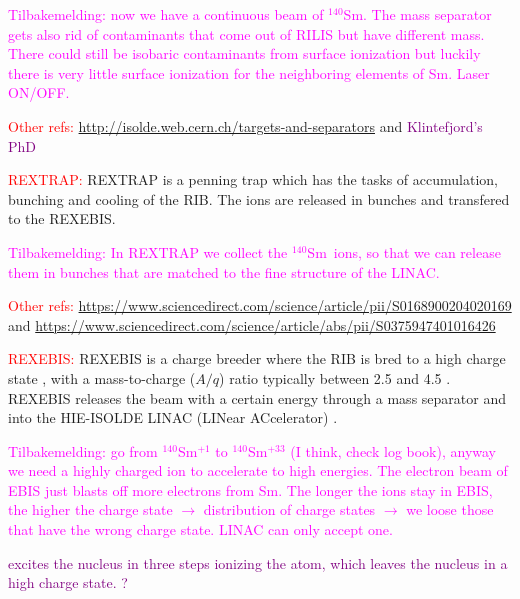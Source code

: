 \documentclass[twoside,english]{uiofysmaster/uiofysmaster}
\newcommand{\Sm}{$^{140}$Sm} %
\begin{document}
\textcolor{Magenta}{Tilbakemelding: \newline
now we have a continuous beam of \Sm. The mass separator gets also rid of contaminants that come out of RILIS but have different mass. There could still be isobaric contaminants from surface ionization but luckily there is very little surface ionization for the neighboring elements of Sm. Laser ON/OFF.}

\textcolor{red}{Other refs:}  \url{http://isolde.web.cern.ch/targets-and-separators} and \textcolor{purple}{Klintefjord's PhD}

\bigskip

\textcolor{red}{REXTRAP:} \newline
REXTRAP is a penning trap which has the tasks of accumulation, bunching and cooling of the RIB. \cite{HIE-ISOLDE} The ions are released in bunches and transfered to the REXEBIS.

\textcolor{Magenta}{Tilbakemelding: \newline 
In REXTRAP we collect the \Sm ~ions, so that we can release them in bunches that are matched to the fine structure of the LINAC.}


\textcolor{red}{Other refs:} \url{https://www.sciencedirect.com/science/article/pii/S0168900204020169} and \url{https://www.sciencedirect.com/science/article/abs/pii/S0375947401016426}

\bigskip

\textcolor{red}{REXEBIS:} \newline
REXEBIS is a charge breeder where the RIB is bred to a high charge state \cite{REXEBIS}, with a mass-to-charge ($A/q$) ratio typically between 2.5 and 4.5 \cite{Post-acc}. REXEBIS releases the beam with a certain energy through a mass separator and into the HIE-ISOLDE LINAC (LINear ACcelerator) \cite{HIE-ISOLDE}. 

\textcolor{Magenta}{Tilbakemelding: \newline
go from \Sm$^{+1}$ to \Sm$^{+33}$ (I think, check log book), anyway we need a highly charged ion to accelerate to high energies. The electron beam of EBIS just blasts off more electrons from Sm. The longer the ions stay in EBIS, the higher the charge state $\rightarrow$ distribution of charge states $\rightarrow$ we loose those that have the wrong charge state. LINAC can only accept one.}

\textcolor{purple}{excites the nucleus in three steps ionizing the atom, which leaves the nucleus in a high charge state.  ?}

\bigskip
\end{document}
